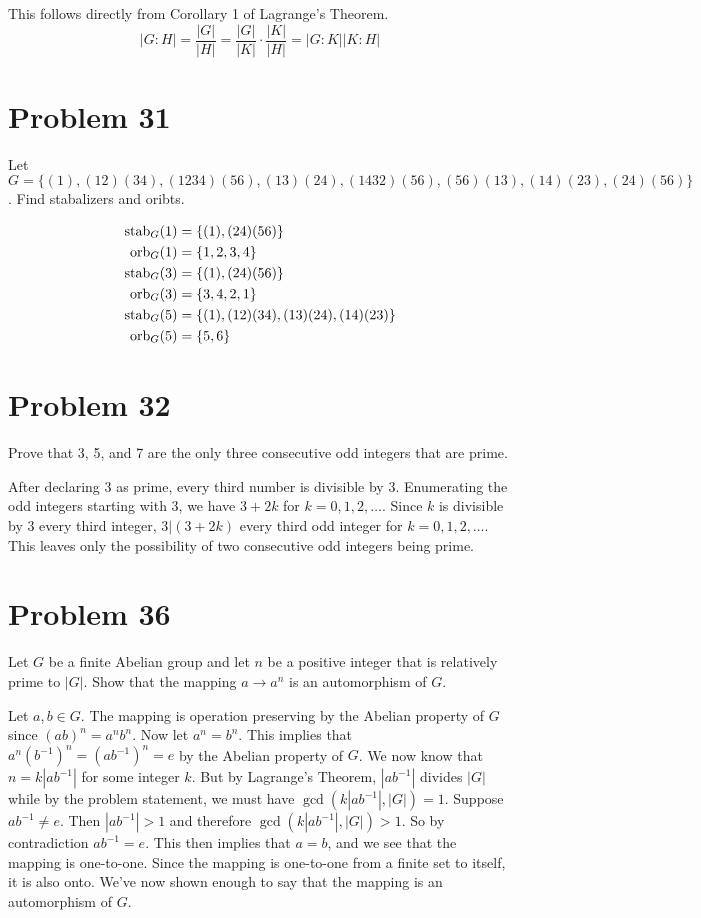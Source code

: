 \documentclass{article}
\begin{document}
This follows directly from Corollary 1 of Lagrange's Theorem.
\begin{equation*}
|G:H|=\frac{|G|}{|H|}=\frac{|G|}{|K|}\cdot\frac{|K|}{|H|}=|G:K||K:H|
\end{equation*}

\section*{Problem 31}

Let $G=\{(1),(12)(34),(1234)(56),(13)(24),(1432)(56),(56)(13),(14)(23),(24)(56)\}$.
Find stabalizers and oribts.

\begin{align*}
\mbox{stab}_G(1) &= \{(1),(24)(56)\} \\
\mbox{orb}_G(1) &= \{1,2,3,4\} \\
\mbox{stab}_G(3) &= \{(1),(24)(56)\} \\
\mbox{orb}_G(3) &= \{3,4,2,1\} \\
\mbox{stab}_G(5) &= \{(1),(12)(34),(13)(24),(14)(23)\} \\
\mbox{orb}_G(5) &= \{5,6\}
\end{align*}

\section*{Problem 32}

Prove that 3, 5, and 7 are the only three consecutive odd integers that
are prime.

After declaring 3 as prime, every third number is divisible by 3.
Enumerating the odd integers starting with 3, we have $3+2k$ for
$k=0,1,2,\dots$.  Since $k$ is divisible by 3 every third integer,
$3|(3+2k)$ every third odd integer for $k=0,1,2,\dots$.
This leaves only the possibility of two consecutive odd integers being prime.

\section*{Problem 36}

Let $G$ be a finite Abelian group and let $n$ be a positive integer that is
relatively prime to $|G|$.  Show that the mapping $a\to a^n$ is an automorphism
of $G$.

Let $a,b\in G$.
The mapping is operation preserving by the Abelian property of $G$ since
$(ab)^n=a^nb^n$.  Now let $a^n=b^n$.  This implies that $a^n(b^{-1})^n=(ab^{-1})^n=e$
by the Abelian property of $G$.  We now know that $n=k|ab^{-1}|$ for some integer $k$.
But by Lagrange's Theorem, $|ab^{-1}|$ divides $|G|$ while by the problem statement, we must
have $\gcd(k|ab^{-1}|,|G|)=1$.  Suppose $ab^{-1}\neq e$.  Then $|ab^{-1}|>1$ and
therefore $\gcd(k|ab^{-1}|,|G|)>1$.  So by contradiction $ab^{-1}=e$.  This then implies
that $a=b$, and we see that the mapping is one-to-one.  Since the mapping is one-to-one
from a finite set to itself, it is also onto.  We've now shown enough to say that
the mapping is an automorphism of $G$.
\end{document}
